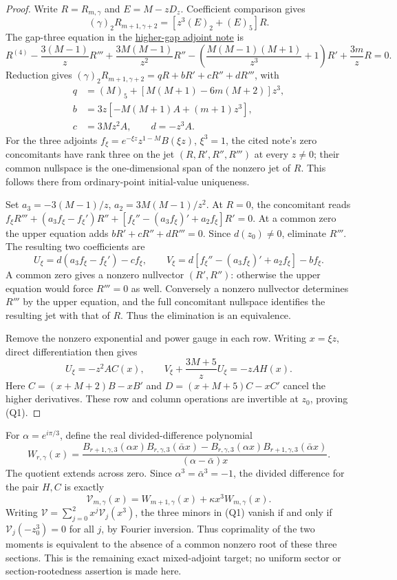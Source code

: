 \documentclass[11pt]{article}
\begin{document}
\begin{proof}
Write $R=R_{m,\gamma}$ and $E=M-zD_z$. Coefficient comparison gives
\[
 (\gamma)_2R_{m+1,\gamma+2}=[z^3(E)_2+(E)_5]R.
\]
The gap-three equation in the
\href{HIGHER_GAP_ADJOINT_RANK.tex}{higher-gap adjoint note} is
\[
 R^{(4)}-\frac{3(M-1)}zR'''
 +\frac{3M(M-1)}{z^2}R''
 -\left(\frac{M(M-1)(M+1)}{z^3}+1\right)R'
 +\frac{3m}zR=0.
\]
Reduction gives $(\gamma)_2R_{m+1,\gamma+2}=qR+bR'+cR''+dR'''$,
with
\[
\begin{aligned}
 q&=(M)_5+[M(M+1)-6m(M+2)]z^3,\\
 b&=3z[-M(M+1)A+(m+1)z^3],\\
 c&=3Mz^2A,\qquad d=-z^3A.
\end{aligned}                                           \tag{Q2}\label{eq:mixed-quintic-reduction}
\]
For the three adjoints
$f_\xi=e^{-\xi z}z^{1-M}B(\xi z)$, $\xi^3=1$,
the cited note's zero concomitants have rank three on the jet
$(R,R',R'',R''')$ at every $z\ne0$; their common nullspace
is the one-dimensional span of the nonzero jet of $R$.
This follows there from ordinary-point initial-value uniqueness.

Set $a_3=-3(M-1)/z$, $a_2=3M(M-1)/z^2$.
At $R=0$, the concomitant reads
$f_\xi R'''+(a_3f_\xi-f_\xi')R''
+[f_\xi''-(a_3f_\xi)'+a_2f_\xi]R'=0$.
At a common zero the upper equation adds
$bR'+cR''+dR'''=0$. Since $d(z_0)\ne0$, eliminate $R'''$.
The resulting two coefficients are
\[
 U_\xi=d(a_3f_\xi-f_\xi')-cf_\xi,\qquad
 V_\xi=d[f_\xi''-(a_3f_\xi)'+a_2f_\xi]-bf_\xi .
\]
A common zero gives a nonzero nullvector $(R',R'')$:
otherwise the upper equation would force $R'''=0$ as well.
Conversely a nonzero nullvector determines $R'''$ by the upper
equation, and the full concomitant nullspace identifies the resulting
jet with that of $R$. Thus the elimination is an equivalence.

Remove the nonzero exponential and power gauge in each row.
Writing $x=\xi z$, direct differentiation then gives
\[
 U_\xi=-z^2A C(x),\qquad
 V_\xi+\frac{3M+5}{z}U_\xi=-zA H(x).
\]
Here $C=(x+M+2)B-xB'$ and $D=(x+M+5)C-xC'$ cancel the
higher derivatives. These row and column operations are invertible
at $z_0$, proving (Q1).
\end{proof}

For $\alpha=e^{i\pi/3}$, define the real divided-difference polynomial
\[
 W_{r,\gamma}(x)=
 \frac{B_{r+1,\gamma,3}(\alpha x)B_{r,\gamma,3}(\bar\alpha x)
       -B_{r,\gamma,3}(\alpha x)B_{r+1,\gamma,3}(\bar\alpha x)}
      {(\alpha-\bar\alpha)x}.
\]
The quotient extends across zero. Since $\alpha^3=\bar\alpha^3=-1$,
the divided difference for the pair $H,C$ is exactly
\[
 \mathcal V_{m,\gamma}(x)
   =W_{m+1,\gamma}(x)+\kappa x^3W_{m,\gamma}(x).           \tag{Q3}\label{eq:mixed-quintic-polynomial}
\]
Writing $\mathcal V=\sum_{j=0}^2x^j\mathcal V_j(x^3)$,
the three minors in (Q1) vanish if and only if
$\mathcal V_j(-z_0^3)=0$ for all $j$, by Fourier inversion.
Thus coprimality of the two moments is equivalent to the absence
of a common nonzero root of these three sections. This is the
remaining exact mixed-adjoint target; no uniform sector or
section-rootedness assertion is made here.
\end{document}
